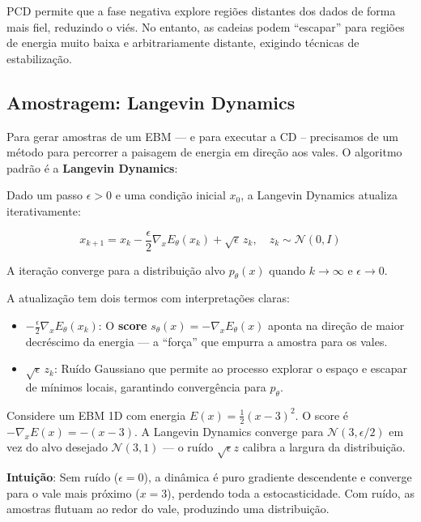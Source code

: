 \documentclass{tufte-handout}
\begin{document}
PCD permite que a fase negativa explore regiões distantes dos dados de forma mais fiel, reduzindo o viés. No entanto, as cadeias podem ``escapar'' para regiões de energia muito baixa e arbitrariamente distante, exigindo técnicas de estabilização.

\subsection{Amostragem: Langevin Dynamics}

Para gerar amostras de um EBM --- e para executar a CD -- precisamos de um método para percorrer a paisagem de energia em direção aos vales. O algoritmo padrão é a \textbf{Langevin Dynamics}:

\begin{defn}
Dado um passo $\epsilon > 0$ e uma condição inicial $x_0$, a Langevin Dynamics atualiza iterativamente:

\begin{equation}
x_{k+1} = x_k - \frac{\epsilon}{2} \nabla_x E_\theta(x_k) + \sqrt{\epsilon} \, z_k, \quad z_k \sim \mathcal{N}(0, I)
\end{equation}

A iteração converge para a distribuição alvo $p_\theta(x)$ quando $k \to \infty$ e $\epsilon \to 0$.
\end{defn}

A atualização tem dois termos com interpretações claras:

\begin{itemize}
    \item $-\frac{\epsilon}{2} \nabla_x E_\theta(x_k)$: O \textbf{score} $s_\theta(x) = -\nabla_x E_\theta(x)$ aponta na direção de maior decréscimo da energia --- a ``força'' que empurra a amostra para os vales.
    \item $\sqrt{\epsilon} \, z_k$: Ruído Gaussiano que permite ao processo explorar o espaço e escapar de mínimos locais, garantindo convergência para $p_\theta$.
\end{itemize}

\begin{exmp}[Langevin em 1D]
Considere um EBM 1D com energia $E(x) = \frac{1}{2}(x - 3)^2$. O score é $-\nabla_x E(x) = -(x - 3)$. A Langevin Dynamics converge para $\mathcal{N}(3, \epsilon/2)$ em vez do alvo desejado $\mathcal{N}(3, 1)$ --- o ruído $\sqrt{\epsilon} z$ calibra a largura da distribuição.

\textbf{Intuição}: Sem ruído ($\epsilon = 0$), a dinâmica é puro gradiente descendente e converge para o vale mais próximo ($x = 3$), perdendo toda a estocasticidade. Com ruído, as amostras flutuam ao redor do vale, produzindo uma distribuição.
\end{exmp}
\end{document}
